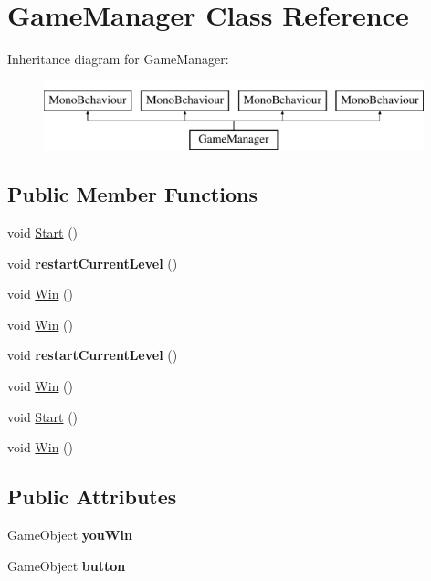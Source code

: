 \hypertarget{class_game_manager}{}\section{Game\+Manager Class Reference}
\label{class_game_manager}
Inheritance diagram for Game\+Manager\+:\begin{figure}[H]
\begin{center}
\leavevmode
\includegraphics[height=2.000000cm]{class_game_manager}
\end{center}
\end{figure}
\subsection*{Public Member Functions}
\begin{DoxyCompactItemize}
\item 
void \mbox{\hyperlink{class_game_manager_a5ccfacd027ad08eeb4ff1f25a7f59c98}{Start}} ()
\item 
\mbox{\label{class_game_manager_ae2cc78847735157b111b650aff1c8826}} 
void {\bfseries restart\+Current\+Level} ()
\item 
void \mbox{\hyperlink{class_game_manager_a76a27f36d082e328bd1c7748d8832816}{Win}} ()
\item 
void \mbox{\hyperlink{class_game_manager_a76a27f36d082e328bd1c7748d8832816}{Win}} ()
\item 
\mbox{\label{class_game_manager_ae2cc78847735157b111b650aff1c8826}} 
void {\bfseries restart\+Current\+Level} ()
\item 
void \mbox{\hyperlink{class_game_manager_a76a27f36d082e328bd1c7748d8832816}{Win}} ()
\item 
void \mbox{\hyperlink{class_game_manager_a5ccfacd027ad08eeb4ff1f25a7f59c98}{Start}} ()
\item 
void \mbox{\hyperlink{class_game_manager_a76a27f36d082e328bd1c7748d8832816}{Win}} ()
\end{DoxyCompactItemize}
\subsection*{Public Attributes}
\begin{DoxyCompactItemize}
\item 
\mbox{\label{class_game_manager_a12f4696dde998b2eb7194584c11d55b8}} 
Game\+Object {\bfseries you\+Win}
\item 
\mbox{\label{class_game_manager_a737138fe2ff6ef0f54a947a405b6b027}} 
Game\+Object {\bfseries button}
\end{DoxyCompactItemize}
